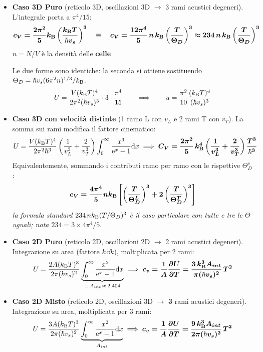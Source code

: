 \begin{itemize}
    \item \textbf{Caso 3D Puro} (reticolo 3D, oscillazioni 3D $\to$ 3 rami acustici degeneri). L'integrale porta a $\pi^4/15$:
    \[ \bm{c_V = \frac{2\pi^2}{5}k_{\mathrm{B}}\left(\frac{k_{\mathrm{B}} T}{\hbar v_s}\right)^{3}}
       \quad\equiv\quad
       \bm{c_V = \frac{12\pi^4}{5}\,n\,k_{\mathrm{B}}\left(\frac{T}{\Theta_D}\right)^{3} \approx 234\, n\,k_{\mathrm{B}}\left(\frac{T}{\Theta_D}\right)^{3}} \]
    $n = N/V$ è la densità delle \textbf{celle}
    
    Le due forme sono identiche: la seconda si ottiene sostituendo $\Theta_D = \hbar v_s (6\pi^2 n)^{1/3}/k_{\mathrm{B}}$.
    \[ U = \frac{V(k_{\mathrm{B}} T)^4}{2\pi^2(\hbar v_s)^3}\cdot 3\cdot\frac{\pi^4}{15}
       \qquad\Longrightarrow\qquad u = \frac{\pi^2}{10}\frac{(k_{\mathrm{B}} T)^4}{(\hbar v_s)^3} \]

    \item \textbf{Caso 3D con velocità distinte} (1 ramo L con $v_L$ e 2 rami T con $v_T$). La somma sui rami modifica il fattore cinematico:
    \[ U = \frac{V (k_{\mathrm{B}} T)^4}{2\pi^2 \hbar^3}\left(\frac{1}{v_L^3}+\frac{2}{v_T^3}\right)\int_0^\infty\frac{x^3}{\mathrm{e}^x-1}\mathrm{d} x
       \implies \bm{C_V = \frac{2\pi^2}{5}\,k_{\mathrm{B}}^4\left(\frac{1}{v_L^3}+\frac{2}{v_T^3}\right)\frac{T^3}{\hbar^3}} \]
    Equivalentemente, sommando i contributi ramo per ramo con le rispettive $\Theta_D^{s}$:
    \[ \bm{c_V = \frac{4\pi^4}{5}nk_{\mathrm{B}}\left[\left(\frac{T}{\Theta_D^{L}}\right)^3 + 2\left(\frac{T}{\Theta_D^{T}}\right)^3\right]} \]
    \textit{la formula standard $234\,nk_{\mathrm{B}}(T/\Theta_D)^3$ è il caso particolare con tutte e tre le $\Theta$ uguali; nota $234 = 3\times 4\pi^4/5$}.

    \item \textbf{Caso 2D Puro} (reticolo 2D, oscillazioni 2D $\to$ 2 rami acustici degeneri). Integrazione su area (fattore $k\,\dd k$), moltiplicata per 2 rami:
    \[ U = \frac{2 A (k_{\mathrm{B}} T)^3}{2\pi (\hbar v_s)^2}\underbrace{\int_0^\infty \frac{x^2}{\mathrm{e}^x - 1}\mathrm{d} x}_{\equiv\,A_{int}\,\approx\,2.404}
       \implies \bm{c_v = \frac{1}{A}\frac{\partial U}{\partial T} = \frac{3\,k_{\mathrm{B}}^3 A_{int}}{\pi(\hbar v_s)^2}\,T^2} \]

    \item \textbf{Caso 2D Misto} (reticolo 2D, oscillazioni 3D $\to$ \textbf{3} rami acustici degeneri). Integrazione su area, moltiplicata per 3 rami:
    \[ U = \frac{3 A (k_{\mathrm{B}} T)^3}{2\pi (\hbar v_s)^2}\underbrace{\int_0^\infty \frac{x^2}{\mathrm{e}^x - 1}\mathrm{d} x}_{A_{int}}
       \implies \bm{c_v = \frac{1}{A}\frac{\partial U}{\partial T} = \frac{9\,k_{\mathrm{B}}^3 A_{int}}{2\pi(\hbar v_s)^2}\,T^2} \]



\end{itemize}
